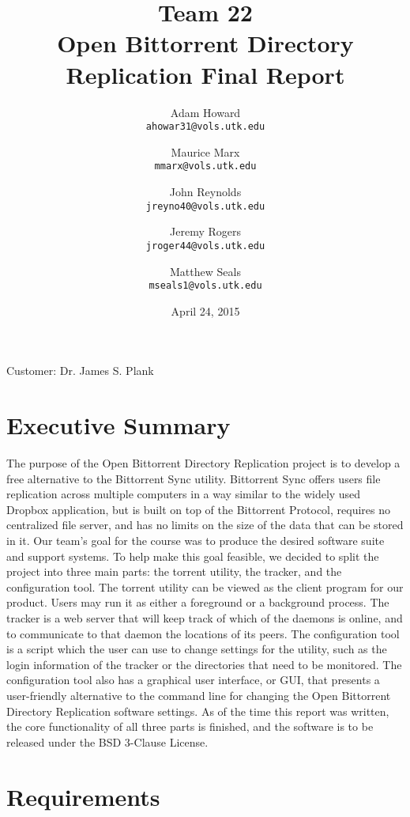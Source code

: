 \documentclass[12 pt]{article}
\title{Team 22 \\
	Open Bittorrent Directory Replication Final Report}
\author{Adam Howard \\
	\texttt{ahowar31@vols.utk.edu}
	\and
	Maurice Marx \\
	\texttt{mmarx@vols.utk.edu}
	\and
	John Reynolds \\
	\texttt{jreyno40@vols.utk.edu}
	\and
	Jeremy Rogers \\
	\texttt{jroger44@vols.utk.edu}
	\and
	Matthew Seals \\
	\texttt{mseals1@vols.utk.edu}}
\date{April 24, 2015}
\begin{document}
	\maketitle
	\vspace{180 pt}
	Customer: Dr. James S. Plank
	\pagebreak
	\doublespacing
	
	\tableofcontents
	
	\pagebreak
	
	\section{Executive Summary}
	
	The purpose of the Open Bittorrent Directory Replication project is to develop a free alternative to the Bittorrent Sync utility. Bittorrent Sync offers users file replication across multiple computers in a way similar to the widely used Dropbox application, but is built on top of the Bittorrent Protocol, requires no centralized file server, and has no limits on the size of the data that can be stored in it. Our team's goal for the course was to produce the desired software suite and support systems. To help make this goal feasible, we decided to split the project into three main parts: the torrent utility, the tracker, and the configuration tool. The torrent utility can be viewed as the client program for our product. Users may run it as either a foreground or a background process. The tracker is a web server that will keep track of which of the daemons is online, and to communicate to that daemon the locations of its peers. The configuration tool is a script which the user can use to change settings for the utility, such as the login information of the tracker or the directories that need to be monitored. The configuration tool also has a graphical user interface, or GUI, that presents a user-friendly alternative to the command line for changing the Open Bittorrent Directory Replication software settings. As of the time this report was written, the core functionality of all three parts is finished, and the software is to be released under the BSD 3-Clause License.
	
	\pagebreak
	
	\section{Requirements}
	
\end{document}
